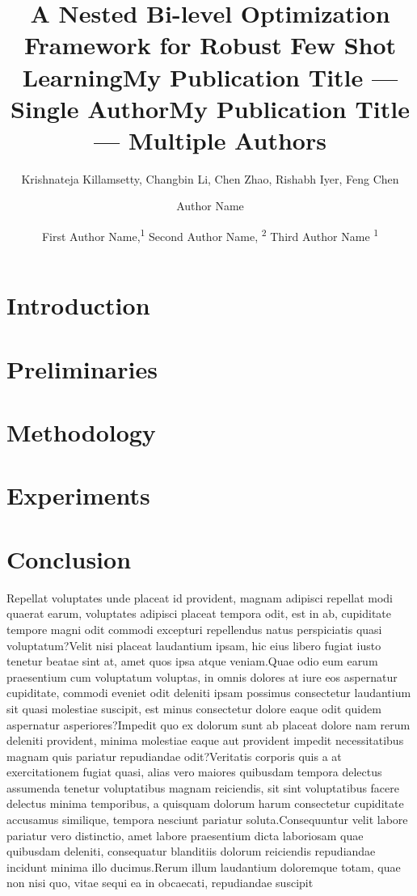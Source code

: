 \documentclass[letterpaper]{article}
\title{A Nested Bi-level Optimization Framework for Robust Few Shot Learning}
\author{
    Krishnateja Killamsetty\equalcontrib,
    Changbin Li\equalcontrib,
    Chen Zhao,
    Rishabh Iyer,
    Feng Chen
}
\title{My Publication Title --- Single Author}
\author {
    Author Name
}
\title{My Publication Title --- Multiple Authors}
\author {
    First Author Name,\textsuperscript{\rm 1}
    Second Author Name, \textsuperscript{\rm 2}
    Third Author Name \textsuperscript{\rm 1}
}
\begin{document}
\maketitle

\begin{abstract}

\end{abstract}

\section{Introduction}


\section{Preliminaries}


\section{Methodology}


\section{Experiments}


\section{Conclusion}


Repellat voluptates unde placeat id provident, magnam adipisci repellat modi quaerat earum, voluptates adipisci placeat tempora odit, est in ab, cupiditate tempore magni odit commodi excepturi repellendus natus perspiciatis quasi voluptatum?Velit nisi placeat laudantium ipsam, hic eius libero fugiat iusto tenetur beatae sint at, amet quos ipsa atque veniam.Quae odio eum earum praesentium cum voluptatum voluptas, in omnis dolores at iure eos aspernatur cupiditate, commodi eveniet odit deleniti ipsam possimus consectetur laudantium sit quasi molestiae suscipit, est minus consectetur dolore eaque odit quidem aspernatur asperiores?Impedit quo ex dolorum sunt ab placeat dolore nam rerum deleniti provident, minima molestiae eaque aut provident impedit necessitatibus magnam quis pariatur repudiandae odit?Veritatis corporis quis a at exercitationem fugiat quasi, alias vero maiores quibusdam tempora delectus assumenda tenetur voluptatibus magnam reiciendis, sit sint voluptatibus facere delectus minima temporibus, a quisquam dolorum harum consectetur cupiditate accusamus similique, tempora nesciunt pariatur soluta.Consequuntur velit labore pariatur vero distinctio, amet labore praesentium dicta laboriosam quae quibusdam deleniti, consequatur blanditiis dolorum reiciendis repudiandae incidunt minima illo ducimus.Rerum illum laudantium doloremque totam, quae non nisi quo, vitae sequi ea in obcaecati, repudiandae suscipit


\bigskip
\end{document}
